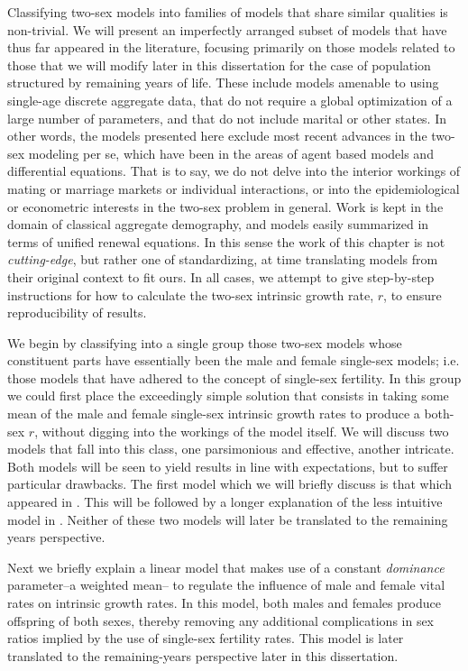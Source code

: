 Classifying two-sex models into families of models that share similar qualities
is non-trivial. We will present an imperfectly arranged subset of models that
have thus far appeared in the literature, focusing primarily on those models
related to those that we will modify later in this dissertation for the case of
population structured by remaining years of life. These include models amenable
to using single-age discrete aggregate data, that do not require a global
optimization of a large number of parameters, and that do not include marital
or other states. In other words, the models presented here exclude most recent
advances in the two-sex modeling per se, which have been in the areas of agent 
based models and differential equations. That is to say, we do not delve into the 
interior workings of mating or marriage markets or individual interactions, or
into the epidemiological or econometric interests in the two-sex problem in general. Work
is kept in the domain of classical aggregate demography, and models easily
summarized in terms of unified renewal equations. In this sense the work of
this chapter is not \textit{cutting-edge}, but rather one of standardizing, at
time translating models from their original context to fit ours. In all cases,
we attempt to give step-by-step instructions for how to calculate the
two-sex intrinsic growth rate, $r$, to ensure reproducibility of results.

We begin by classifying into a single group those two-sex models whose
constituent parts have essentially been the male and female single-sex models;
i.e. those models that have adhered to the concept of single-sex fertility. In this group
we could first place the exceedingly simple solution that consists in taking some 
mean of the male and female single-sex intrinsic growth rates to produce a 
both-sex $r$, without digging into the workings of the model
itself\citep[e.g.][]{kuczynski1932fertility}. We will discuss two models that
fall into this class, one parsimonious and effective, another intricate. Both
models will be seen to yield results in line with expectations, but to suffer
particular drawbacks. The first model which we will briefly discuss is that
which appeared in \citet{pollard1948measurement}. This will be followed by
a longer explanation of the less intuitive model in \citet{mitra1978derivation}.
Neither of these two models will later be translated to the remaining years
perspective.

Next we briefly explain a linear model that makes use of a constant
\textit{dominance} parameter--a weighted mean-- to regulate the
influence of male and female vital rates on intrinsic growth rates. In this
model, both males and females produce offspring of both sexes, thereby
removing any additional complications in sex ratios implied by the use of
single-sex fertility rates. This model is later translated to the
remaining-years perspective later in this dissertation.

